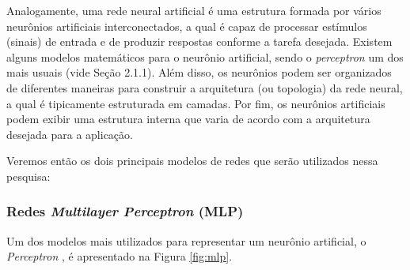 \documentclass[a4paper, 12pt]{article}
\begin{document}
Analogamente, uma rede neural artificial é uma estrutura formada por vários neurô\-nios artificiais interconectados, a qual é capaz de processar estímulos (sinais) de entrada e de produzir respostas conforme a tarefa desejada. Existem alguns modelos matemáticos para o neurônio artificial, sendo o \textit{perceptron} um dos mais usuais (vide Seção 2.1.1). Além disso, os neurônios podem ser organizados de diferentes maneiras para construir a arquitetura (ou topologia) da rede neural, a qual é tipicamente estruturada em camadas. Por fim, os neurônios artificiais podem exibir uma estrutura interna que varia de acordo com a arquitetura desejada para a aplicação.

Veremos então os dois principais modelos de redes que serão utilizados nessa pesquisa:

\subsubsection{Redes \textit{Multilayer Perceptron} (MLP)}
Um dos modelos mais utilizados para representar um neurônio artificial, o \textit{Perceptron} \cite{rosenblatt1958perceptron}, é apresentado na Figura \ref{fig:mlp}.
\end{document}
